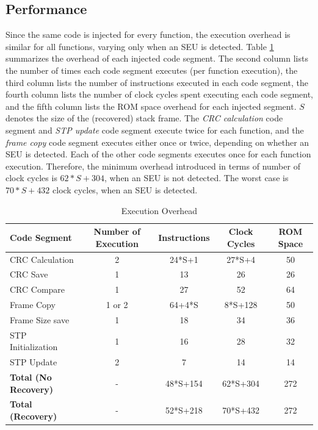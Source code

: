\subsection{Performance}
\vspace{-5pt}
Since the same code is injected for every function, the execution overhead is similar for all functions, varying only when an SEU is detected. Table \ref{tbl_speed_overhead} summarizes the overhead of each injected code segment. The second column lists the number of times each code segment executes (per function execution), the third column lists the number of instructions executed in each code segment, the fourth column lists the number of clock cycles spent executing each code segment, and the fifth column lists the ROM space overhead for each injected segment. $S$ denotes the size of the (recovered) stack frame. The \textit{CRC calculation} code segment and \textit{STP update} code segment execute twice for each function, and the \textit{frame copy} code segment executes either once or twice, depending on whether an SEU is detected. Each of the other code segments executes once for each function execution. Therefore, the minimum overhead introduced in terms of number of clock cycles is $62*S+304$, when an SEU is not detected. The worst case is $70*S+432$ clock cycles, when an SEU is detected. 
\begin{table}
	\center
    \begin{tabular}{|l|c|c|c|c|}
    \hline
   \textbf{ Code Segment}   & \textbf{Number of Execution} & \textbf{Instructions} & \textbf{Clock Cycles} & \textbf{ROM Space}	\\ \hline
    CRC Calculation         & 2			& 24*S+1		& 27*S+4		& 50				\\ \hline
    CRC Save                & 1			& 13			& 26           	& 26				\\ \hline
    CRC Compare             & 1			& 27			& 52		   	& 64				\\ \hline
    Frame Copy				& 1 or 2	& 64+4*S		& 8*S+128      	& 50				\\ \hline
    Frame Size save         & 1			& 18			& 34           	& 36				\\ \hline
    STP Initialization		& 1			& 16			& 28		   	& 32				\\ \hline
	STP Update				& 2			& 7				& 14			& 14				\\ \hline
	\textbf{Total (No Recovery)} & -	 	& 48*S+154     	& 62*S+304		& 272  		\\ \hline
	\textbf{Total (Recovery)}& -	 		& 52*S+218     	& 70*S+432		& 272 		\\ \hline
    \end{tabular}
    \caption {Execution Overhead}
    \label{tbl_speed_overhead}
\end{table}

